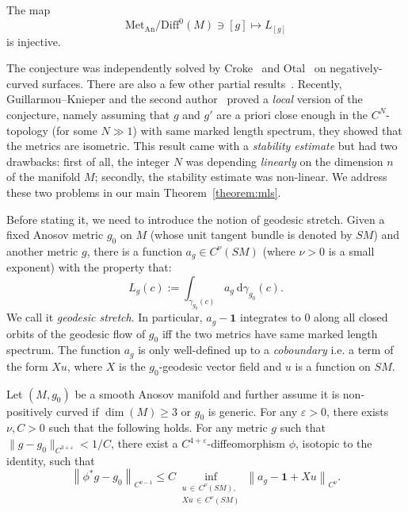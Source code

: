\documentclass[AHL,Unicode,longabstracts,published]{cedram}
\newcommand{\bfun}{\mathbf{1}}
\newcommand{\eps}{\varepsilon}
\newcommand{\dd}{\mathrm{d}}
\newcommand{\Met}{\mathrm{Met}}
\newcommand{\An}{\mathrm{An}}
\newcommand{\Diff}{\mathrm{Diff}}
\begin{document}
\begin{conjecture}
The map
\[
\Met_{\An}/\Diff^0(M) \ni [g] \mapsto L_{[g]}
\]
is injective.
\end{conjecture}


The conjecture was independently solved by Croke~\cite{Croke-90} and Otal~\cite{Otal-90} on negatively-curved surfaces. There are also a few other partial results~\cite{Besson-Courtois-Gallot-95,Hamenstadt-99,Katok-88}. Recently, Guillarmou--Knieper and the second author~\cite{Guillarmou-Knieper-Lefeuvre-19,Guillarmou-Lefeuvre-18} proved a \emph{local} version of the conjecture, namely assuming that $g$ and $g'$ are a priori close enough in the $C^N$-topology (for some $N \gg 1$) with same marked length spectrum, they showed that the metrics are isometric. This result came with a \emph{stability estimate} but had two drawbacks: first of all, the integer $N$ was depending \emph{linearly} on the dimension $n$ of the manifold $M$; secondly, the stability estimate was non-linear. We address these two problems in our main Theorem~\ref{theorem:mls}.

Before stating it, we need to introduce the notion of geodesic stretch. Given a fixed Anosov metric $g_0$ on $M$ (whose unit tangent bundle is denoted by $SM$) and another metric $g$, there is a function $a_g \in C^\nu(SM)$ (where $\nu > 0$ is a small exponent) with the property that:
\[
L_g(c) := \int_{\gamma_{g_0}(c)} a_g~\dd \gamma_{g_0}(c).
\]
We call it \emph{geodesic stretch}. In particular, $a_g-\bfun$ integrates to $0$ along all closed orbits of the geodesic flow of $g_0$ iff the two metrics have same marked length spectrum. The function $a_g$ is only well-defined up to a \emph{coboundary} i.e. a term of the form $X u$, where $X$ is the $g_0$-geodesic vector field and $u$ is a function on $SM$.


\begin{theo}\label{theorem:mls}
Let $(M,g_0)$ be a smooth Anosov manifold and further assume it is non-positively curved if $\dim(M) \geq 3$ or $g_0$ is generic. For any $\eps>0$, there exists $\nu, C > 0$ such that the following holds. For any metric $g$ such that $\|g-g_0\|_{C^{3+\eps}} < 1/C$, there exist a $C^{4+\eps}$-diffeomorphism $\phi$, isotopic to the identity, such that
\[
\left\| \phi^* g - g_0 \right\|_{C^{\nu-1}} \leq C \inf_{\substack{u\,\in\,C^\nu(SM), \\ Xu\,\in\,C^\nu(SM)}} \left\|a_g-\bfun + Xu\right\|_{C^{\nu}}.
\]
\end{theo}
\end{document}
